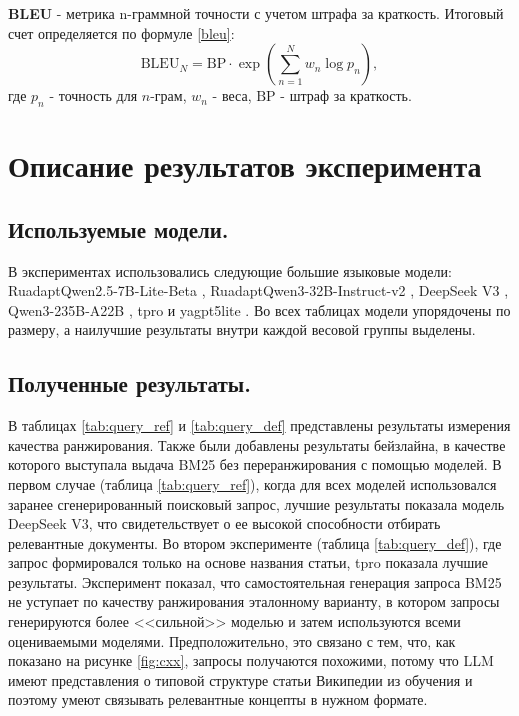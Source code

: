 \documentclass{article}
\begin{document}
\textbf{BLEU} \cite{bleu} - метрика n-граммной точности с учетом штрафа за краткость. Итоговый счет определяется по формуле \eqref{bleu}:
\begin{equation}\label{bleu}
\mathrm{BLEU}_N = \mathrm{BP}\cdot \exp\!\left(\sum_{n=1}^{N} w_n \log p_n\right),
\end{equation}
где \(p_n\) - точность для \(n\)-грам, \(w_n\) - веса, $\mathrm{BP}$ - штраф за краткость.

\section*{Описание результатов эксперимента}
\subsection*{Используемые модели.}
В экспериментах использовались следующие большие языковые модели: 
RuadaptQwen2.5-\allowbreak 7B-\allowbreak Lite-\allowbreak Beta \cite{ruadapt},
RuadaptQwen3-\allowbreak 32B-\allowbreak Instruct-\allowbreak v2 \cite{ruadapt}, 
DeepSeek V3 \cite{deepseek}, 
Qwen3-\allowbreak 235B-\allowbreak A22B \cite{qwen3}, 
tpro \cite{tpro} и yagpt5lite \cite{yagpt}.
Во всех таблицах модели упорядочены по размеру, а наилучшие результаты внутри каждой весовой группы выделены.

\subsection*{Полученные результаты.}
В таблицах \ref{tab:query_ref} и \ref{tab:query_def} представлены результаты измерения качества ранжирования. 
Также были добавлены результаты бейзлайна, в качестве которого выступала выдача BM25 без переранжирования с помощью моделей. 
В первом случае (таблица \ref{tab:query_ref}), когда для всех моделей использовался заранее сгенерированный поисковый запрос, 
лучшие результаты показала модель DeepSeek V3, что свидетельствует о ее высокой способности отбирать релевантные документы.
Во втором эксперименте (таблица \ref{tab:query_def}), где запрос формировался только на основе названия статьи, tpro показала лучшие результаты. 
Эксперимент показал, что самостоятельная генерация запроса BM25 не уступает по качеству ранжирования эталонному варианту, в котором запросы генерируются более <<сильной>> моделью и затем
используются всеми оцениваемыми моделями. Предположительно, это связано с тем, что, как показано на рисунке \ref{fig:cxx}, запросы получаются похожими, потому что
LLM имеют представления о типовой структуре статьи Википедии из обучения и поэтому умеют связывать релевантные концепты в нужном формате.
\end{document}

